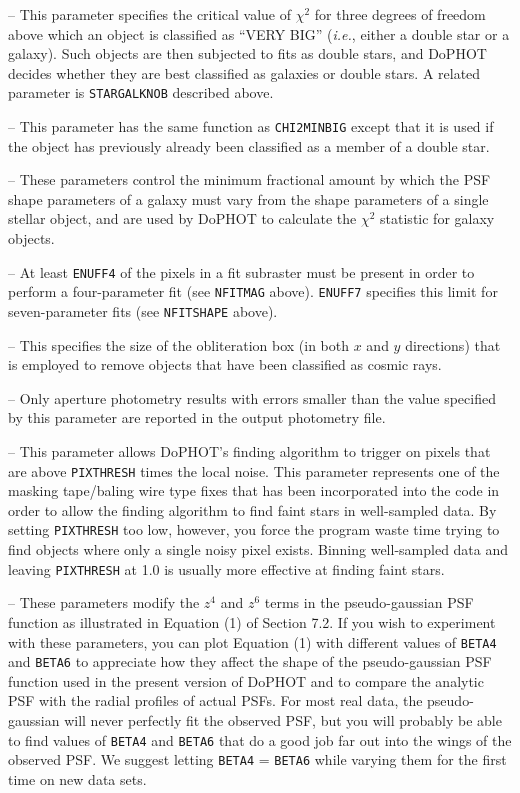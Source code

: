  -- This parameter specifies the critical
value of $\chi^2$ for three degrees of freedom
above which an object is classified as
``VERY BIG'' ({\it i.e.}, either a double star or a galaxy).  
Such objects are then subjected to fits as
double stars, and DoPHOT decides whether they are best classified
as galaxies or double stars. A related parameter is {\tt STARGALKNOB}
described above.

 -- This parameter has the same function as
{\tt CHI2MINBIG} except that it is used if the object has
previously already been classified as a member of a double star.

 -- These parameters control
the minimum fractional amount by which the PSF shape parameters
of a galaxy must vary from the shape parameters of a single
stellar object, and are used by DoPHOT to calculate the 
$\chi^2$ statistic for galaxy objects.

 -- At least {\tt ENUFF4} of the 
pixels in a fit subraster must be present in order to 
perform a four-parameter fit (see {\tt NFITMAG} above).
{\tt ENUFF7} specifies this limit for seven-parameter
fits (see {\tt NFITSHAPE} above).

 -- This specifies the size of the
obliteration box (in both $x$ and $y$ directions) that is
employed to remove objects that have been classified as
cosmic rays.

 -- Only aperture photometry 
results with errors smaller than the value specified
by this parameter are reported in the output photometry
file.

 -- This parameter allows DoPHOT's
finding algorithm to trigger on pixels that are above
{\tt PIXTHRESH} times the local noise.  This parameter
represents one of the masking tape/baling wire type fixes
that has been incorporated into the code in order to 
allow the finding algorithm to find faint stars in 
well-sampled data.  By setting {\tt PIXTHRESH} too low,
however, you force the program waste time trying to
find objects where only a single noisy pixel exists.  
Binning well-sampled data and leaving {\tt PIXTHRESH}
at 1.0 is usually more effective at finding faint stars.

 -- These parameters modify the
$z^4$ and $z^6$ terms in the pseudo-gaussian PSF function
as illustrated in Equation (1) of Section 7.2.  If you wish
to experiment with these parameters, you can  
plot Equation (1) with different values of
{\tt BETA4} and {\tt BETA6} to appreciate how they 
affect the shape of the pseudo-gaussian PSF function used
in the present version of DoPHOT and to compare the
analytic PSF with the radial profiles of actual PSFs.  For most
real data, the pseudo-gaussian will never perfectly fit
the observed PSF, but you will probably be able to find
values of {\tt BETA4} and {\tt BETA6} that do a good job
far out into the wings of the observed PSF.  We suggest letting
{\tt BETA4} = {\tt BETA6} while varying them for the first time
on new data sets.

